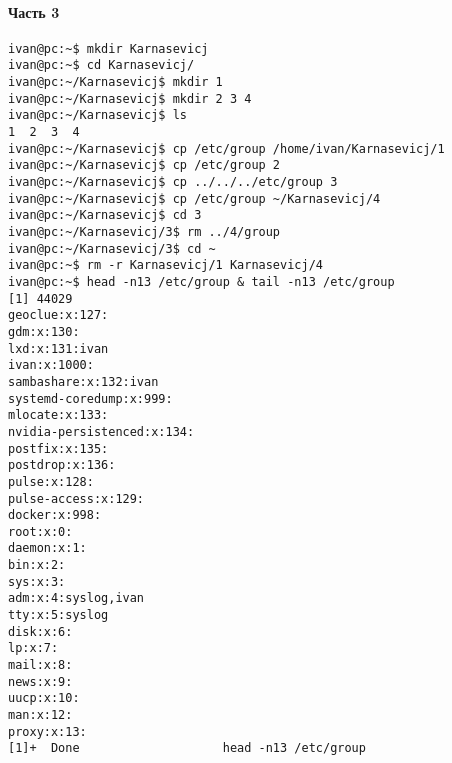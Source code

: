 \paragraph{Часть 3}

\begin{verbatim}
ivan@pc:~$ mkdir Karnasevicj
ivan@pc:~$ cd Karnasevicj/
ivan@pc:~/Karnasevicj$ mkdir 1
ivan@pc:~/Karnasevicj$ mkdir 2 3 4
ivan@pc:~/Karnasevicj$ ls
1  2  3  4
ivan@pc:~/Karnasevicj$ cp /etc/group /home/ivan/Karnasevicj/1
ivan@pc:~/Karnasevicj$ cp /etc/group 2
ivan@pc:~/Karnasevicj$ cp ../../../etc/group 3
ivan@pc:~/Karnasevicj$ cp /etc/group ~/Karnasevicj/4
ivan@pc:~/Karnasevicj$ cd 3
ivan@pc:~/Karnasevicj/3$ rm ../4/group 
ivan@pc:~/Karnasevicj/3$ cd ~
ivan@pc:~$ rm -r Karnasevicj/1 Karnasevicj/4
ivan@pc:~$ head -n13 /etc/group & tail -n13 /etc/group
[1] 44029
geoclue:x:127:
gdm:x:130:
lxd:x:131:ivan
ivan:x:1000:
sambashare:x:132:ivan
systemd-coredump:x:999:
mlocate:x:133:
nvidia-persistenced:x:134:
postfix:x:135:
postdrop:x:136:
pulse:x:128:
pulse-access:x:129:
docker:x:998:
root:x:0:
daemon:x:1:
bin:x:2:
sys:x:3:
adm:x:4:syslog,ivan
tty:x:5:syslog
disk:x:6:
lp:x:7:
mail:x:8:
news:x:9:
uucp:x:10:
man:x:12:
proxy:x:13:
[1]+  Done                    head -n13 /etc/group
\end{verbatim}